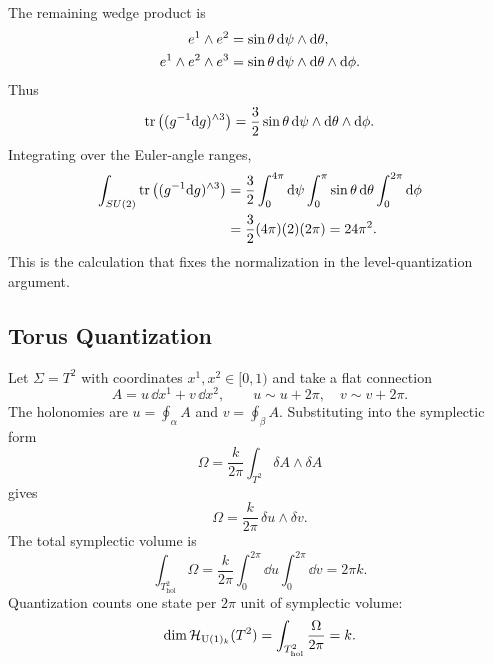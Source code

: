 The remaining wedge product is
\begin{align}
  e^1\wedge e^2
  &=
  \sin\theta\,\mathrm{d}\psi\wedge\mathrm{d}\theta,
  \notag\\
  e^1\wedge e^2\wedge e^3
  &=
  \sin\theta\,\mathrm{d}\psi\wedge\mathrm{d}\theta\wedge\mathrm{d}\phi.
  \label{eq:dense-e123}
\end{align}
Thus
\begin{equation}
  \operatorname{tr}\left((g^{-1}\mathrm{d} g)^{\wedge 3}\right)
  =
  \frac32\sin\theta
  \,\mathrm{d}\psi\wedge\mathrm{d}\theta\wedge\mathrm{d}\phi.
  \label{eq:dense-wz-euler-density}
\end{equation}
Integrating over the Euler-angle ranges,
\begin{align}
  \int_{SU(2)}
  \operatorname{tr}\left((g^{-1}\mathrm{d} g)^{\wedge 3}\right)
  &=
  \frac32
  \int_0^{4\pi}\mathrm{d}\psi
  \int_0^\pi\sin\theta\,\mathrm{d}\theta
  \int_0^{2\pi}\mathrm{d}\phi
  \notag\\
  &=
  \frac32(4\pi)(2)(2\pi)
  =
  24\pi^2.
  \label{eq:dense-euler-integral}
\end{align}
This is the calculation that fixes the normalization in the level-quantization argument.


\subsection{Torus Quantization}
\label{subsec:dense-u1-torus-quantization}

Let $\Sigma=T^2$ with coordinates $x^1,x^2\in[0,1)$ and take a flat connection
\begin{equation}
  A=u\,\dd x^1+v\,\dd x^2,
  \qquad
  u\sim u+2\pi,\quad v\sim v+2\pi.
  \label{eq:dense-flat-torus-A}
\end{equation}
The holonomies are $u=\oint_\alpha A$ and $v=\oint_\beta A$. Substituting into the symplectic form
\begin{equation}
  \Omega=\frac{k}{2\pi}\int_{T^2}\delta A\wedge\delta A
  \label{eq:dense-torus-symplectic-start}
\end{equation}
gives
\begin{equation}
  \Omega=\frac{k}{2\pi}\,\delta u\wedge\delta v.
  \label{eq:dense-torus-symplectic}
\end{equation}
The total symplectic volume is
\begin{equation}
  \int_{T^2_{\mathrm{hol}}}\Omega
  =
  \frac{k}{2\pi}
  \int_0^{2\pi}\dd u
  \int_0^{2\pi}\dd v
  =
  2\pi k.
  \label{eq:dense-torus-volume}
\end{equation}
Quantization counts one state per $2\pi$ unit of symplectic volume:
\begin{equation}
  \dim\mathcal H_{\operatorname{U}(1)_k}(T^2)
  =
  \int_{T^2_{\mathrm{hol}}}\frac{\Omega}{2\pi}
  =
  k.
  \label{eq:dense-torus-state-count}
\end{equation}

